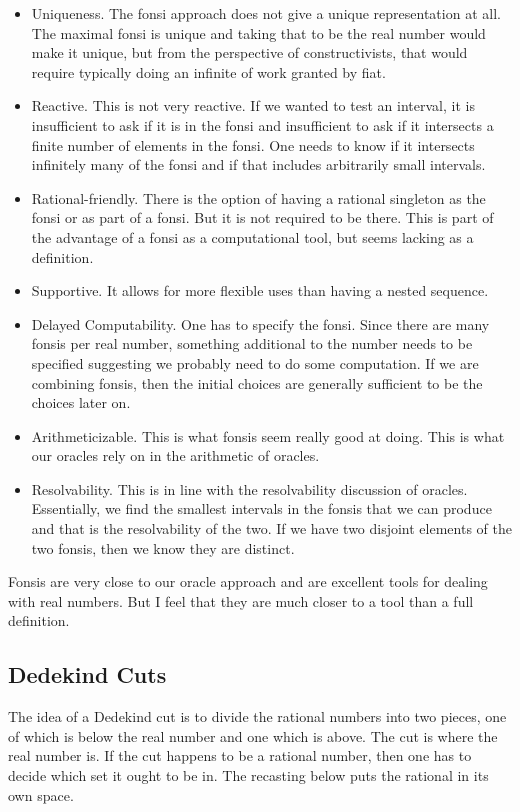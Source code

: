 \documentclass[12pt]{article}
\theoremstyle{remark}
\begin{document}
\begin{itemize}
    \item Uniqueness. The fonsi approach does not give a unique representation at all. The maximal fonsi is unique and taking that to be the real number would make it unique, but from the perspective of constructivists, that would require typically doing an infinite of work granted by fiat. 
    \item Reactive. This is not very reactive. If we wanted to test an interval, it is insufficient to ask if it is in the fonsi and insufficient to ask if it intersects a finite number of elements in the fonsi. One needs to know if it intersects infinitely many of the fonsi and if that includes arbitrarily small intervals. 
    \item Rational-friendly. There is the option of having a rational singleton as the fonsi or as part of a fonsi. But it is not required to be there. This is part of the advantage of a fonsi as a computational tool, but seems lacking as a definition. 
    \item Supportive. It allows for more flexible uses than having a nested sequence.
    \item Delayed Computability. One has to specify the fonsi. Since there are many fonsis per real number, something additional to the number needs to be specified suggesting we probably need to do some computation. If we are combining fonsis, then the initial choices are generally sufficient to be the choices later on. 
    \item Arithmeticizable. This is what fonsis seem really good at doing. This is what our oracles rely on in the arithmetic of oracles. 
    \item Resolvability. This is in line with the resolvability discussion of oracles. Essentially, we find the smallest intervals in the fonsis that we can produce and that is the resolvability of the two. If we have two disjoint elements of the two fonsis, then we know they are distinct. 
\end{itemize}

Fonsis are very close to our oracle approach and are excellent tools for dealing with real numbers. But I feel that they are much closer to a tool than a full definition.
  
\subsection{Dedekind Cuts}

The idea of a Dedekind cut is to divide the rational numbers into two pieces, one of which is below the real number and one which is above. The cut is where the real number is. If the cut happens to be a rational number, then one has to decide which set it ought to be in. The recasting below puts the rational in its own space. 
\end{document}
